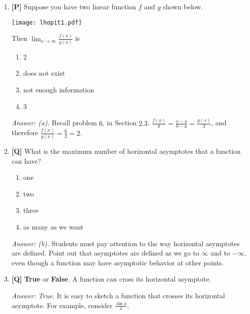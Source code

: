 \documentclass[12pt]{article}
\begin{document}
\begin{enumerate}
{\it Answer: False.} Students might be thinking that $\infty$ is a number, and therefore $\infty -\infty=0$. As a quick counterexample, consider $f(x)=x^2$ and $g(x)=x$.

\bigskip

\item {\bf [P]} Suppose you have two linear function $f$ and $g$ shown below.

\begin{center}
\texttt{[image: lhopit1.pdf]}
\end{center}

Then $\displaystyle{\lim_{x\rightarrow \infty}\frac{f(x)}{g(x)}}$ is
\begin {enumerate}
\item 2
\item does not exist
\item not enough information
\item 3
\end{enumerate}

{\it Answer: (a).} Recall problem $6.$ in Section $2.3$.
$\frac{f(x)}{6}=\frac{ x-a}{0-a}=\frac{ g(x)}{3}$, and therefore $\frac {f(x)}{g(x)}=\frac {6}{3}=2$.

\bigskip

\item {\bf [Q]} What is the maximum number of horizontal asymptotes that a function can have?
\begin{enumerate}
\item one
\item two
\item three
\item as many as we want 
\end{enumerate}

{\it Answer: (b).} Students must pay attention to the way horizontal asymptotes are defined. Point out that asymptotes are defined as we go to $\infty$ and to $-\infty$, even though a function may have asymptotic behavior at other points.

\bigskip

\item {\bf [Q]} \textbf{True} or \textbf{False}. A function can cross its horizontal asymptote.

{\it Answer: True.} It is easy to sketch a function that crosses its horizontal asymptote. For example, consider $\frac{\sin x}{x}$.

\end{enumerate}

\pagebreak
\end{document}
